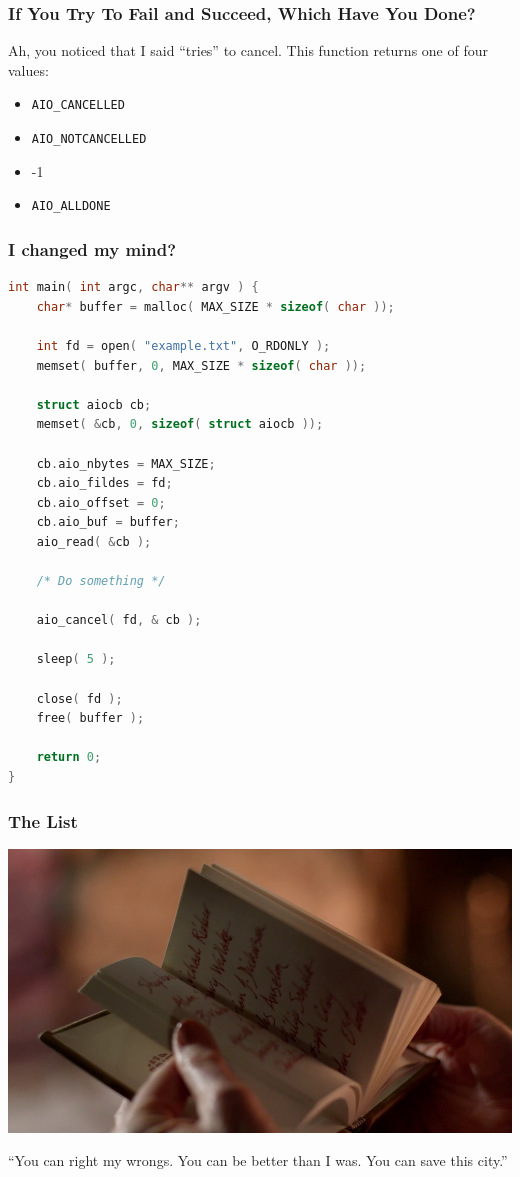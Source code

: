 \begin{frame}
	\frametitle{If You Try To Fail and Succeed, Which Have You Done?}

	Ah, you noticed that I said ``tries'' to cancel. This function returns one of four values:
	\begin{itemize}
		\item \texttt{AIO\_CANCELLED}
		\item \texttt{AIO\_NOTCANCELLED}
		\item -1
		\item \texttt{AIO\_ALLDONE}
	\end{itemize}

\end{frame}


\begin{frame}[fragile]
	\frametitle{I changed my mind?}

	\begin{lstlisting}[language=C]
int main( int argc, char** argv ) {
    char* buffer = malloc( MAX_SIZE * sizeof( char ));

    int fd = open( "example.txt", O_RDONLY );
    memset( buffer, 0, MAX_SIZE * sizeof( char ));

    struct aiocb cb;
    memset( &cb, 0, sizeof( struct aiocb ));

    cb.aio_nbytes = MAX_SIZE;
    cb.aio_fildes = fd;
    cb.aio_offset = 0;
    cb.aio_buf = buffer;
    aio_read( &cb );
    
    /* Do something */
    
    aio_cancel( fd, & cb );

    sleep( 5 );

    close( fd );
    free( buffer );

    return 0;
}
\end{lstlisting}

\end{frame}


\begin{frame}
	\frametitle{The List}

	\begin{center}
		\includegraphics[width=\textwidth]{images/thelist-arrow.png}
	\end{center}

	``You can right my wrongs. You can be better than I was. You can save this city.''
\end{frame}


